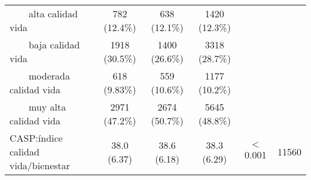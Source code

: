 \documentclass[a4paper,12pt, titlepage]{article}\usepackage[]{graphicx}\usepackage[]{color}
\begin{document}
\begin{landscape}
\begin{small}
\begin{longtable}{lccccc}
$\qquad$alta calidad vida &     782 (12.4\%)     &     638 (12.1\%)     &    1420 (12.3\%)     &           &      \\ 
$\qquad$baja calidad vida &    1918 (30.5\%)     &    1400 (26.6\%)     &    3318 (28.7\%)     &           &      \\ 
$\qquad$moderada calidad vida &     618 (9.83\%)     &     559 (10.6\%)     &    1177 (10.2\%)     &           &      \\ 
$\qquad$muy alta calidad vida &    2971 (47.2\%)     &    2674 (50.7\%)     &    5645 (48.8\%)     &           &      \\ 
CASP:índice calidad vida/bienestar &     38.0 (6.37)     &     38.6 (6.18)     &     38.3 (6.29)     &  $<$0.001   & 11560 \\ 
 
    \hline
    \end{longtable}\end{small} 


\end{landscape}
\newpage
\end{document}
